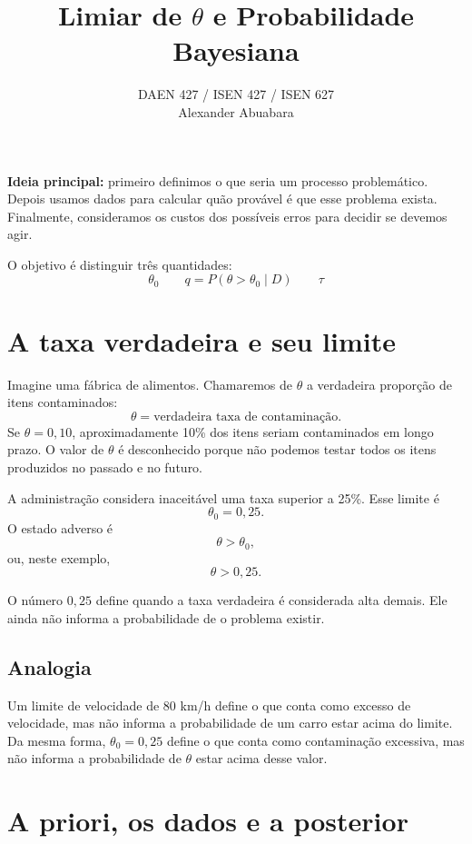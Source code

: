\documentclass[11pt,letter]{article}
\title{\textcolor{aggiemaroon}{Limiar de $\theta$ e Probabilidade Bayesiana}}
\author{DAEN 427 / ISEN 427 / ISEN 627\\
        Alexander Abuabara}
\date{\color{aggiemaroon}{Fall 2026}}
\begin{document}
\maketitle

\begin{ideia}
\textbf{Ideia principal:} primeiro definimos o que seria um processo
problemático. Depois usamos dados para calcular quão provável é que esse
problema exista. Finalmente, consideramos os custos dos possíveis erros para
decidir se devemos agir.
\end{ideia}

O objetivo é distinguir três quantidades:
\[
\boxed{\theta_0\qquad q=P(\theta>\theta_0\mid D)\qquad \tau}
\]

\section{A taxa verdadeira e seu limite}

Imagine uma fábrica de alimentos. Chamaremos de $\theta$ a verdadeira
proporção de itens contaminados:
\[
\theta=\text{verdadeira taxa de contaminação}.
\]
Se $\theta=0{,}10$, aproximadamente 10\% dos itens seriam contaminados em longo
prazo. O valor de $\theta$ é desconhecido porque não podemos testar todos os
itens produzidos no passado e no futuro.

A administração considera inaceitável uma taxa superior a 25\%. Esse limite é
\[
\theta_0=0{,}25.
\]
O estado adverso é
\[
\theta>\theta_0,
\]
ou, neste exemplo,
\[
\theta>0{,}25.
\]

\begin{ideia}
O número $0{,}25$ define quando a taxa verdadeira é considerada alta demais.
Ele ainda não informa a probabilidade de o problema existir.
\end{ideia}

\subsection{Analogia}

Um limite de velocidade de 80 km/h define o que conta como excesso de
velocidade, mas não informa a probabilidade de um carro estar acima do limite.
Da mesma forma, $\theta_0=0{,}25$ define o que conta como contaminação
excessiva, mas não informa a probabilidade de $\theta$ estar acima desse valor.

\section{A priori, os dados e a posterior}
\end{document}

